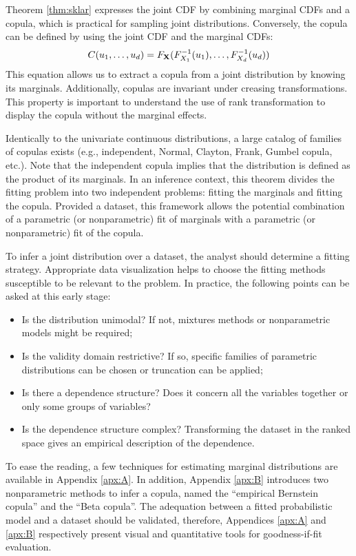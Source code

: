 Theorem \ref{thm:sklar} expresses the joint CDF by combining marginal CDFs and a copula, which is practical for sampling joint distributions. 
Conversely, the copula can be defined by using the joint CDF and the marginal CDFs: 
\begin{equation}
    C(u_1, \dots, u_d) = F_{{\bf X}}(F^{-1}_{X_1}(u_1), \dots, F^{-1}_{X_d}(u_d))
\end{equation}
This equation allows us to extract a copula from a joint distribution by knowing its marginals.
Additionally, copulas are invariant under creasing transformations. 
This property is important to understand the use of rank transformation to display the copula without the marginal effects.     

Identically to the univariate continuous distributions, a large catalog of families of copulas exists (e.g., independent, Normal, Clayton, Frank, Gumbel copula, etc.). 
Note that the independent copula implies that the distribution is defined as the product of its marginals. 
In an inference context, this theorem divides the fitting problem into two independent problems: fitting the marginals and fitting the copula. 
Provided a dataset, this framework allows the potential combination of a parametric (or nonparametric) fit of marginals with a parametric (or nonparametric) fit of the copula. 

To infer a joint distribution over a dataset, the analyst should determine a fitting strategy. 
Appropriate data visualization helps to choose the fitting methods susceptible to be relevant to the problem. 
In practice, the following points can be asked at this early stage:
\begin{itemize}
    \item Is the distribution unimodal? If not, mixtures methods or nonparametric models might be required;
    \item Is the validity domain restrictive? If so, specific families of parametric distributions can be chosen or truncation can be applied;
    \item Is there a dependence structure? Does it concern all the variables together or only some groups of variables? 
    \item Is the dependence structure complex? Transforming the dataset in the ranked space gives an empirical description of the dependence. 
\end{itemize} 

To ease the reading, a few techniques for estimating marginal distributions are available in Appendix \ref{apx:A}. 
In addition, Appendix \ref{apx:B} introduces two nonparametric methods to infer a copula, named the ``empirical Bernstein copula'' and the ``Beta copula''. 
The adequation between a fitted probabilistic model and a dataset should be validated, therefore, Appendices \ref{apx:A} and \ref{apx:B} respectively present visual and quantitative tools for goodness-if-fit evaluation.


